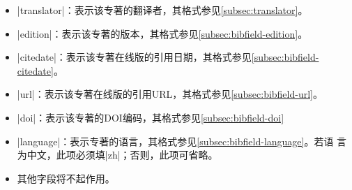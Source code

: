 \begin{itemize}
\item |translator|：表示该专著的翻译者，其格式参见\ref{subsec:translator}。
\item |edition|：表示该专著的版本，其格式参见\ref{subsec:bibfield-edition}。
\item |citedate|：表示该专著在线版的引用日期，其格式参见\ref{subsec:bibfield-citedate}。
\item |url|：表示该专著在线版的引用URL，其格式参见\ref{subsec:bibfield-url}。
\item |doi|：表示该专著的DOI编码，其格式参见\ref{subsec:bibfield-doi}
\item |language|：表示专著的语言，其格式参见\ref{subsec:bibfield-language}。若语
  言为中文，此项必须填|zh|；否则，此项可省略。
\item 其他字段将不起作用。
\end{itemize}


